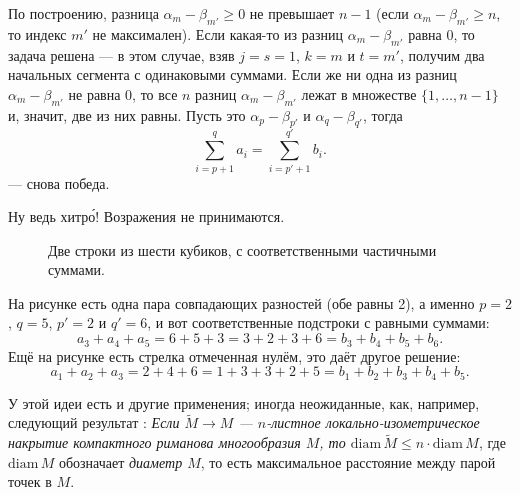 По построению, разница $\alpha_m-\beta_{m'}\ge 0$ не превышает $n-1$ 
(если $\alpha_m-\beta_{m'}\ge n$, то индекс $m'$ не максимален).
Если какая-то из разниц $\alpha_m-\beta_{m'}$ равна $0$, то задача решена --- в этом случае, взяв $j=s=1$, $k=m$ и $t=m'$, получим два начальных сегмента с одинаковыми суммами.
Если же ни одна из разниц $\alpha_m-\beta_{m'}$ не равна $0$, то все $n$ разниц 
$\alpha_m-\beta_{m'}$ лежат в множестве $\{1,\dots,n-1\}$ и, значит, две из них равны.
Пусть это $\alpha_p-\beta_{p'}$ и $\alpha_q-\beta_{q'}$, тогда 
\[\sum_{i=p+1}^qa_i=\sum_{i=p'+1}^{q'}b_i.\]
--- снова победа.

Ну ведь хитр\'{о}!
Возражения не принимаются.

\begin{figure}[h!]
\centering
{}
\caption{Две строки из шести кубиков, с соответственными частичными суммами.}
\label{pic:kubiki}
\end{figure}

На рисунке есть одна пара совпадающих разностей (обе равны 2), а именно $p=2$, $q=5$, $p'=2$ и $q'=6$, и
вот соответственные подстроки с равными суммами:
\[a_3+a_4+a_5=6+5+3=3+2+3+6=b_3+b_4+b_5+b_6.\]
Ещё на рисунке есть стрелка отмеченная нулём, это даёт другое решение:
\[a_1+a_2+a_3=2+4+6=1+3+3+2+5=b_1+b_2+b_3+b_4+b_5.\]

\begin{addedbytheeditors}
У этой идеи есть и другие применения; иногда неожиданные, как, например, следующий результат \cite{petrunin}:
\textit{Если $\tilde M\to M$ --- $n$-листное локально-изометрическое накрытие компактного риманова многообразия $M$, то $\mathrm{diam}\, \tilde M\le n\cdot \mathrm{diam}\, M$}, где $\mathrm{diam}\, M$ обозначает \textit{диаметр $M$}, то есть максимальное расстояние между парой точек в $M$.\pr
\end{addedbytheeditors}
